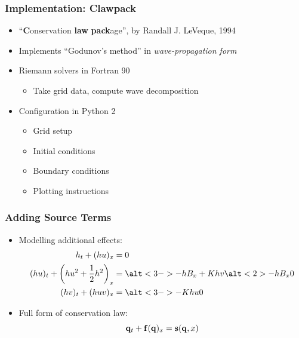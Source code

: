 \documentclass[handout]{beamer}
\begin{document}
\begin{frame}
  \frametitle{Implementation: Clawpack}
  \begin{itemize}
    \item ``\textbf{C}onservation \textbf{law} \textbf{pack}age'', by Randall J. LeVeque, 1994
    \pause
    \item Implements ``Godunov's method'' in \emph{wave-propagation form}
    \pause
    \item Riemann solvers in Fortran 90
    \begin{itemize}
      \item Take grid data, compute wave decomposition
    \end{itemize}
    \pause
    \item Configuration in Python 2
    \begin{itemize}
      \item Grid setup
      \item Initial conditions
      \item Boundary conditions
      \item Plotting instructions
    \end{itemize}
  \end{itemize}
\end{frame}

\begin{frame}
  \frametitle{Adding Source Terms}
  \begin{itemize}
  \item Modelling additional effects:
  \begin{align}
                           h_t + (hu)_x & = 0 \hspace{0.25\textwidth}\\
    (hu)_t + \qty(hu^2 + \frac{1}{2}h^2)_x & = \alt<3->{-hB_x+Khv}{\alt<2>{-hB_x}{0}} \\
                       (hv)_t + (huv)_x & = \alt<3->{-Khu}{0}
  \end{align}
    \item<4-> Full form of conservation law:
    \begin{equation}
      \vb q_t + \vb f(\vb q)_x = \vb s(\vb q, x)
    \end{equation}
  \end{itemize}
\end{frame}
\end{document}
